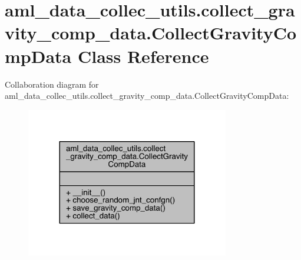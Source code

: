 \hypertarget{classaml__data__collec__utils_1_1collect__gravity__comp__data_1_1_collect_gravity_comp_data}{}\section{aml\+\_\+data\+\_\+collec\+\_\+utils.\+collect\+\_\+gravity\+\_\+comp\+\_\+data.\+Collect\+Gravity\+Comp\+Data Class Reference}
\label{classaml__data__collec__utils_1_1collect__gravity__comp__data_1_1_collect_gravity_comp_data}


Collaboration diagram for aml\+\_\+data\+\_\+collec\+\_\+utils.\+collect\+\_\+gravity\+\_\+comp\+\_\+data.\+Collect\+Gravity\+Comp\+Data\+:
\nopagebreak
\begin{figure}[H]
\begin{center}
\leavevmode
\includegraphics[width=251pt]{classaml__data__collec__utils_1_1collect__gravity__comp__data_1_1_collect_gravity_comp_data__coll__graph}
\end{center}
\end{figure}
